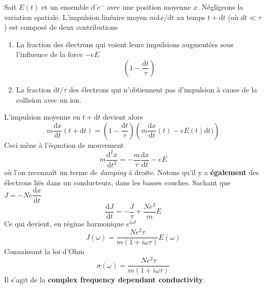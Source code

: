 Soit $E(t)$ et un ensemble d'$e^-$ avec une position moyenne $x$. Négligeons la variation spatiale. L'impulsion
linéaire moyen $m\text{d}x/\text{d}t$ au temps $t+\text{d}t$ (où $dt\ll \tau$) est composé de deux contributions
\begin{enumerate}
\item La fraction des électrons qui voient leurs impulsions augmentées sous l'influence de la force $-eE$
\begin{equation}
\left(1-\dfrac{\text{d}t}{\tau}\right)
\end{equation}
\item La fraction $\text{d}t/\tau$ des électrons qui n'obtiennent pas d'impulsion à cause de la collision avec
un ion.
\end{enumerate}
L'impulsion moyenne en $t+\text{d}t$ devient alors
\begin{equation}
m\dfrac{\text{d}x}{\text{d}t}(t+\text{d}t) = \left(1-\dfrac{\text{d}t}{\tau}\right)\left(m\dfrac{\text{d}x}{
\text{d}t}(t)-eE(t)\text{d}t)\right)
\end{equation}
Ceci mène à l'équation de mouvement
\begin{equation}
m\dfrac{\text{d}^2x}{\text{d}t^2}=-\dfrac{m}{\tau}\dfrac{\text{d}x}{\text{d}t}-eE
\end{equation}
où l'on reconnaît un terme de \textit{damping} à droite. Notons qu'il y a \textbf{également} des électrons
liés dans un conducteurs, dans les basses couches. Sachant que $J = -Ne\dfrac{\text{d}x}{\text{d}t}$
\begin{equation}
\dfrac{\text{d}J}{\text{d}t} = -\dfrac{J}{\tau}+\dfrac{Ne^2}{m}E
\end{equation}
Ce qui devient, en régime harmonique $e^{i\omega t}$
\begin{equation}
J(\omega) = \dfrac{Ne^2\tau}{m(1+i\omega\tau)}E(\omega)
\end{equation}
Connaissant la loi d'Ohm
\begin{equation}
\sigma(\omega) = \dfrac{Ne^2\tau}{m(1+i\omega\tau)}
\end{equation}
Il s'agit de la \textbf{complex frequency dependant conductivity}. \\


